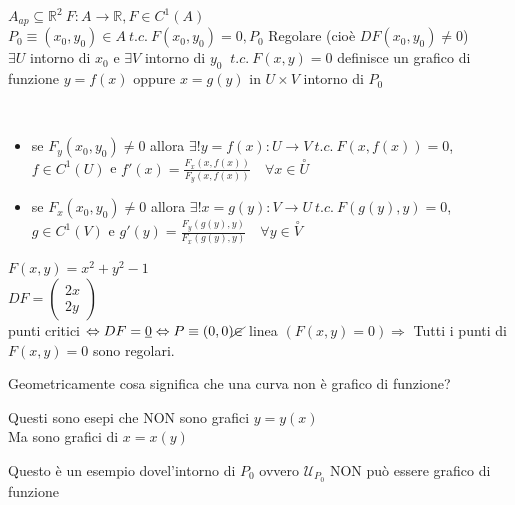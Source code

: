 \documentclass[a4paper, oneside]{article}
\begin{document}
\begin{theorem}
    $A_{ap} \subseteq \mathbb{R}^2 \ F:A\to \mathbb{R}, F \in C^1 (A)$\\
     $P_0 \equiv (x_0,y_0) \in A \ t.c. \ F(x_0,y_0) = 0 , P_0 $ Regolare (cioè $DF(x_0,y_0)\neq 0$)\\
     $\exists U$ intorno di $x_0$ e $\exists V$ intorno di $y_0$ $ \ t.c. \ F(x,y) = 0$ definisce un grafico di funzione $y= f(x)$ oppure $x = g(y)$ in $U\times V$ intorno di $P_0$
\end{theorem}
\\
\begin{itemize}
    \item  se $F_y(x_0,y_0) \neq 0$ allora $\exists! y = f(x):U\to V \ t.c. \ F(x,f(x)) = 0$, $f \in C^1(U)$ e $ f'(x) = \frac{F_x(x,f(x))}{F_y(x,f(x))} \quad \forall x \in \overset{\circ}{U}$
    \item se $F_x(x_0,y_0) \neq 0$ allora $\exists! x = g(y): V \to U \ t.c. \ F(g(y),y) = 0$, $g \in C^1(V)$ e $g'(y) =\frac{F_y(g(y),y)}{F_x(g(y),y)} \quad \forall y \in \overset{\circ}{V}$
\end{itemize}
$F(x,y) = x^2+y^2-1$\\
$DF = \begin{pmatrix}
    2x\\
    2y
\end{pmatrix}$\\
punti critici $\Leftrightarrow DF = \underbar{0} \Leftrightarrow P \equiv(0,0) \cancel{\in}$ linea $(F(x,y) = 0) \Rightarrow $ Tutti i punti di $F(x,y) = 0$ sono regolari.\\
\begin{observation}
    Geometricamente cosa significa che una curva non è grafico di funzione?
    \begin{center}
    \end{center}
    Questi sono esepi che NON sono grafici $y=y(x)$\\
    Ma sono grafici di $x=x(y)$
    \begin{center}
    \end{center}
    Questo è un esempio dovel'intorno di $P_0$ ovvero $\mathcal{U}_{P_0}$ NON può essere grafico di funzione
\end{observation}
\end{document}
